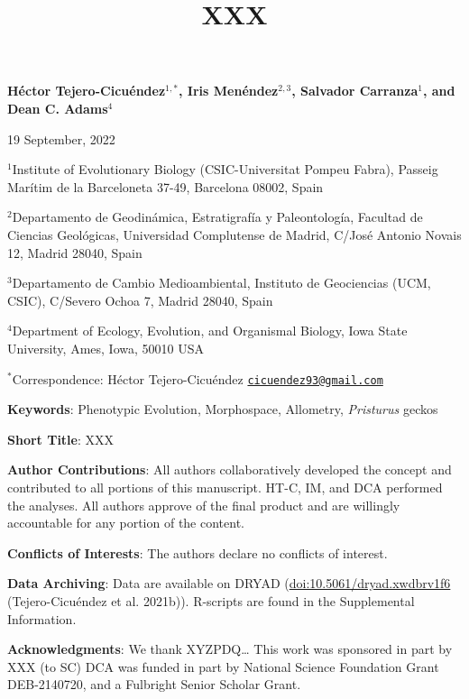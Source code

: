 \documentclass[
]{article}
\title{XXX}
\author{}
\date{\vspace{-2.5em}}
\begin{document}
\maketitle

\begin{center}
\textbf{H{\'{e}}ctor Tejero-Cicu{\'{e}}ndez$^{1,*}$,  Iris Men{\'{e}}ndez$^{2,3}$, Salvador Carranza$^{1}$, and Dean C. Adams$^{4}$} 
\end{center}

\begin{center}19 September, 2022\end{center}

\(^{1}\)Institute of Evolutionary Biology (CSIC-Universitat Pompeu
Fabra), Passeig Marítim de la Barceloneta 37-49, Barcelona 08002, Spain

\(^{2}\)Departamento de Geodinámica, Estratigrafía y Paleontología,
Facultad de Ciencias Geológicas, Universidad Complutense de Madrid,
C/José Antonio Novais 12, Madrid 28040, Spain

\(^{3}\)Departamento de Cambio Medioambiental, Instituto de Geociencias
(UCM, CSIC), C/Severo Ochoa 7, Madrid 28040, Spain

\(^{4}\)Department of Ecology, Evolution, and Organismal Biology, Iowa
State University, Ames, Iowa, 50010 USA

\(^{*}\)Correspondence: Héctor Tejero-Cicuéndez
\href{mailto:cicuendez93@gmail.com}{\nolinkurl{cicuendez93@gmail.com}}

\hfill\break

\textbf{Keywords}: Phenotypic Evolution, Morphospace, Allometry,
\emph{Pristurus} geckos \hfill\break

\textbf{Short Title}: XXX \hfill\break

\textbf{Author Contributions}: All authors collaboratively developed the
concept and contributed to all portions of this manuscript. HT-C, IM,
and DCA performed the analyses. All authors approve of the final product
and are willingly accountable for any portion of the
content.\hfill\break

\textbf{Conflicts of Interests}: The authors declare no conflicts of
interest.\hfill\break

\textbf{Data Archiving}: Data are available on DRYAD
(\url{doi:10.5061/dryad.xwdbrv1f6} (Tejero-Cicuéndez et al. 2021b)).
R-scripts are found in the Supplemental Information. \hfill\break

\textbf{Acknowledgments}: We thank XYZPDQ\ldots{} This work was
sponsored in part by XXX (to SC) DCA was funded in part by National
Science Foundation Grant DEB-2140720, and a Fulbright Senior Scholar
Grant.
\end{document}
